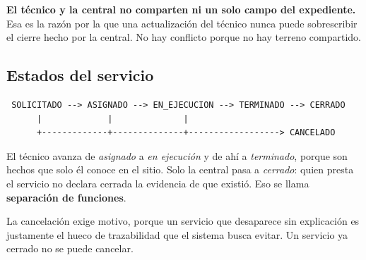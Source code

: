 
\begin{clave}
\textbf{El técnico y la central no comparten ni un solo campo del expediente.} Esa
es la razón por la que una actualización del técnico nunca puede sobrescribir el
cierre hecho por la central. No hay conflicto porque no hay terreno compartido.
\end{clave}

\subsection{Estados del servicio}

\begin{verbatim}
 SOLICITADO --> ASIGNADO --> EN_EJECUCION --> TERMINADO --> CERRADO
      |             |              |
      +-------------+--------------+------------------> CANCELADO
\end{verbatim}

El técnico avanza de \emph{asignado} a \emph{en ejecución} y de ahí a
\emph{terminado}, porque son hechos que solo él conoce en el sitio. Solo la central
pasa a \emph{cerrado}: quien presta el servicio no declara cerrada la evidencia de
que existió. Eso se llama \textbf{separación de funciones}.

La cancelación exige motivo, porque un servicio que desaparece sin explicación es
justamente el hueco de trazabilidad que el sistema busca evitar. Un servicio ya
cerrado no se puede cancelar.

